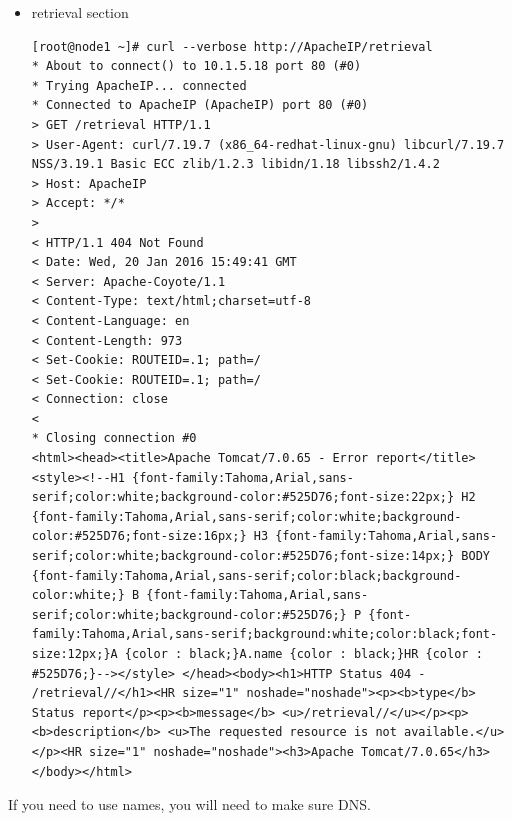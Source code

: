 \documentclass[11pt
  , a4paper
  , article
  , oneside
]{memoir}
\begin{document}
\begin{itemize}
\begin{lstlisting}[style=termstyle]
	
	
	<!-- @begin(site_footer) -->
	<div class="pagefooter">
	</div>
	<!-- @end(site_footer) -->
	</div>
	
	<div id="archapplversions"></div>
	
	<script type="text/javascript">
	$(document).ready(function() {
	$("#pvDetailsParams").hide();
	
	// See if we have any pv names in session storage
	if(sessionStorage && 'archstatpVNames' in sessionStorage) {
	$('#archstatpVNames').val(sessionStorage['archstatpVNames']);
	}
	
	
	// If we have any PVs in the textarea, make a fresh JSON call to refresh status.
	var pvText = $('#archstatpVNames').val();
	if(pvText != null && pvText.length > 0) {
	checkPVStatus();
	}
	
	showVersions();
	
	// Set up help
	$("#help").click(function() { window.open('help/userguide.html#ArchivePV'); } );
	});
	</script>
	
	
	</body>
	* Closing connection #0
	\end{lstlisting}
	\item retrieval section
		\begin{lstlisting}[style=termstyle]
[root@node1 ~]# curl --verbose http://ApacheIP/retrieval
* About to connect() to 10.1.5.18 port 80 (#0)
* Trying ApacheIP... connected
* Connected to ApacheIP (ApacheIP) port 80 (#0)
> GET /retrieval HTTP/1.1
> User-Agent: curl/7.19.7 (x86_64-redhat-linux-gnu) libcurl/7.19.7 NSS/3.19.1 Basic ECC zlib/1.2.3 libidn/1.18 libssh2/1.4.2
> Host: ApacheIP
> Accept: */*
> 
< HTTP/1.1 404 Not Found
< Date: Wed, 20 Jan 2016 15:49:41 GMT
< Server: Apache-Coyote/1.1
< Content-Type: text/html;charset=utf-8
< Content-Language: en
< Content-Length: 973
< Set-Cookie: ROUTEID=.1; path=/
< Set-Cookie: ROUTEID=.1; path=/
< Connection: close
< 
* Closing connection #0
<html><head><title>Apache Tomcat/7.0.65 - Error report</title><style><!--H1 {font-family:Tahoma,Arial,sans-serif;color:white;background-color:#525D76;font-size:22px;} H2 {font-family:Tahoma,Arial,sans-serif;color:white;background-color:#525D76;font-size:16px;} H3 {font-family:Tahoma,Arial,sans-serif;color:white;background-color:#525D76;font-size:14px;} BODY {font-family:Tahoma,Arial,sans-serif;color:black;background-color:white;} B {font-family:Tahoma,Arial,sans-serif;color:white;background-color:#525D76;} P {font-family:Tahoma,Arial,sans-serif;background:white;color:black;font-size:12px;}A {color : black;}A.name {color : black;}HR {color : #525D76;}--></style> </head><body><h1>HTTP Status 404 - /retrieval//</h1><HR size="1" noshade="noshade"><p><b>type</b> Status report</p><p><b>message</b> <u>/retrieval//</u></p><p><b>description</b> <u>The requested resource is not available.</u></p><HR size="1" noshade="noshade"><h3>Apache Tomcat/7.0.65</h3></body></html>
		\end{lstlisting}	
\end{itemize}
If you need to use names, you will need to make sure DNS.
\end{document}
